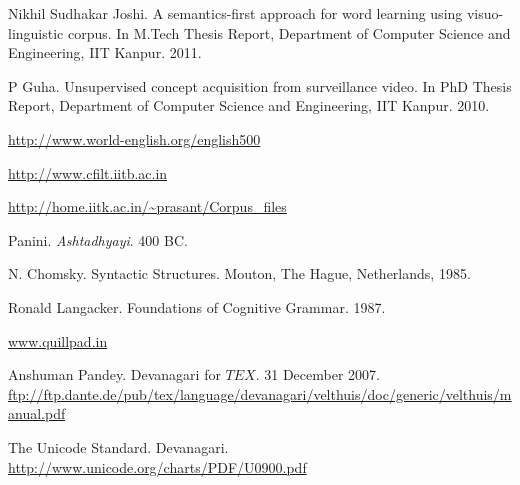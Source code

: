 \documentclass[12pt, a4paper]{report}
\begin{document}
\begin{thebibliography}{1}

Nikhil Sudhakar Joshi. A semantics-first approach for word learning using visuo-linguistic corpus. In M.Tech Thesis Report, Department of Computer Science and Engineering, IIT Kanpur. 2011.

P Guha. Unsupervised concept acquisition from surveillance video. In PhD Thesis Report, Department of Computer Science and Engineering, IIT Kanpur. 2010.

\url{http://www.world-english.org/english500}

\url{http://www.cfilt.iitb.ac.in}

\url{http://home.iitk.ac.in/~prasant/Corpus_files}

Panini. \textit{Ashtadhyayi}. 400 BC.

N. Chomsky. Syntactic Structures. Mouton, The Hague, Netherlands, 1985.

Ronald Langacker. Foundations of Cognitive Grammar. 1987.

\url{www.quillpad.in}

Anshuman Pandey. Devanagari for $TEX$. 31 December 2007. \url{ftp://ftp.dante.de/pub/tex/language/devanagari/velthuis/doc/generic/velthuis/manual.pdf}

The Unicode Standard. Devanagari. \url{http://www.unicode.org/charts/PDF/U0900.pdf}


\end{thebibliography}
\end{document}
